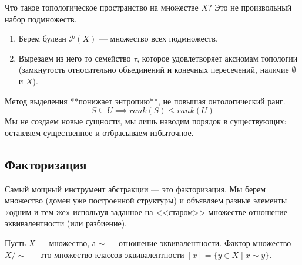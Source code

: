 \documentclass[11pt, a4paper]{extarticle}
\newcommand{\Pcal}{{\mathcal P}}
\renewcommand{\le}{\leqslant}
\begin{document}
    \begin{example}
    Что такое топологическое пространство на множестве $X$?
    Это не произвольный набор подмножеств.
    \begin{enumerate}
        \item Берем булеан $\Pcal(X)$ — множество всех подмножеств.
        \item Вырезаем из него то семейство $\tau$, которое удовлетворяет аксиомам топологии (замкнутость относительно объединений и конечных пересечений, наличие $\emptyset$ и $X$).
    \end{enumerate}
    \end{example}
    
    
    \begin{remark}
    Метод выделения **понижает энтропию**, не повышая онтологический ранг.
    $$ S \subseteq U \implies rank(S) \le rank(U) $$
    Мы не создаем новые сущности, мы лишь наводим порядок в существующих: оставляем существенное и отбрасываем избыточное.
    \end{remark}
    


\subsection{Факторизация}

Самый мощный инструмент абстракции --- это факторизация. Мы берем множество (домен уже построенной структуры) и объявляем разные элементы «одним и тем же» используя заданное на <<старом>> множестве отношение эквивалентности (или разбиение).

\begin{definition}
Пусть $X$ --- множество, а $\sim$ --- отношение эквивалентности. Фактор-множество $X/{\sim}$ --- это множество классов эквивалентности $[x] = \{y \in X \mid x \sim y\}$.
\end{definition}
\end{document}
